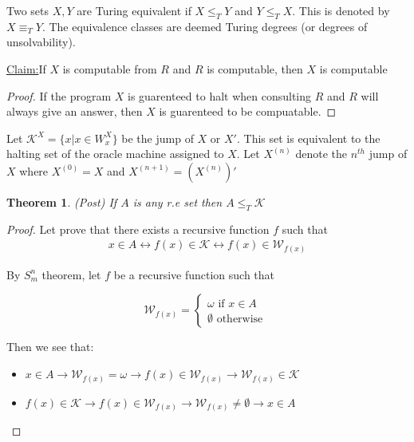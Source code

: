 \documentclass[a4paper,10pt]{article}
\newenvironment{claim}[1]{\par\noindent\underline{Claim:}\space#1}{}
\newenvironment{definition}[1][Definition]{\begin{trivlist}
\item[\hskip \labelsep {\bfseries #1}]}{\end{trivlist}}
\newtheorem{theorem}{Theorem}[section]
\newcommand*\map{\rightarrow}
\newcommand*\biject{\leftrightarrow}
\newcommand*\turred{\leq_T}
\newcommand*\tureq{\equiv_T}
\newcommand*\halt{\mathcal{K}}
\newcommand*\partf{\mathcal{W}}
\begin{document}
    \begin{definition}
     Two sets $X,Y$ are Turing equivalent if $X \turred Y$ and $Y \turred X$. This is denoted by $X \tureq Y$. The equivalence classes are deemed Turing degrees (or degrees of unsolvability).
    \end{definition}
    
     \begin{claim}
     If $X$ is computable from $R$ and $R$ is computable, then $X$ is computable 
    \end{claim} 
    
    \begin{proof}
     If the program $X$ is guarenteed to halt when consulting $R$ and $R$ will always give an answer, then $X$ is guarenteed to be compuatable.
    \end{proof}
 
    \begin{definition}
     Let $\halt^X = \{x \vert x \in W_x^X\}$ be the jump of $X$ or $X'$. This set is equivalent to the halting set of the oracle machine assigned to $X$. Let $X^{(n)}$ denote the $n^{th}$ jump of $X$ where $X^{(0)} = X$ and $X^{(n+1)} = (X^{(n)})'$
    \end{definition}

    \begin{theorem} \label{enumerhalt}
     (Post) If $A$ is any r.e set then $A \leq_T \mathcal{K}$ 
    \end{theorem}
    
    \begin{proof}
     Let prove that there exists a recursive function $f$ such that 
     \begin{gather*}
      x \in A \biject f(x) \in \halt \biject f(x) \in \partf_{f(x)}
     \end{gather*}

     By $S_m^n$ theorem, let $f$ be a recursive function such that
     
     
     $$ \partf_{f(x)} = \begin{cases} \omega \text{ if $x \in A$} \\ \emptyset \text{ otherwise } \end{cases} $$
    
      Then we see that:
      \begin{itemize}
       \item $x \in A \map \partf_{f(x)} = \omega \map f(x) \in \partf_{f(x)} \map \partf_{f(x)} \in \halt$ 
       \item $f(x) \in \halt \map f(x) \in \partf_{f(x)} \map \partf_{f(x)} \neq \emptyset \map x \in A$
      \end{itemize}
    \end{proof}
\end{document}
